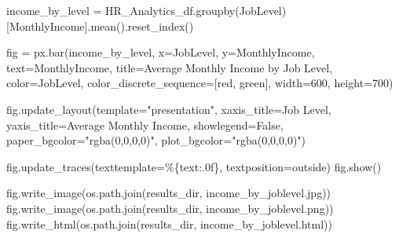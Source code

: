 \documentclass[
  letterpaper,
  DIV=11,
  numbers=noendperiod]{scrartcl}
\newenvironment{Shaded}{\begin{snugshade}}{\end{snugshade}}
\newcommand{\DecValTok}[1]{\textcolor[rgb]{0.68,0.00,0.00}{#1}}
\newcommand{\NormalTok}[1]{\textcolor[rgb]{0.00,0.23,0.31}{#1}}
\newcommand{\OperatorTok}[1]{\textcolor[rgb]{0.37,0.37,0.37}{#1}}
\newcommand{\SpecialCharTok}[1]{\textcolor[rgb]{0.37,0.37,0.37}{#1}}
\newcommand{\StringTok}[1]{\textcolor[rgb]{0.13,0.47,0.30}{#1}}
\newcommand{\VariableTok}[1]{\textcolor[rgb]{0.07,0.07,0.07}{#1}}
\begin{document}
\begin{Shaded}
\begin{Highlighting}[]
\NormalTok{income\_by\_level }\OperatorTok{=}\NormalTok{ HR\_Analytics\_df.groupby(}\StringTok{\textquotesingle{}JobLevel\textquotesingle{}}\NormalTok{)[}\StringTok{\textquotesingle{}MonthlyIncome\textquotesingle{}}\NormalTok{].mean().reset\_index()}

\NormalTok{fig }\OperatorTok{=}\NormalTok{ px.bar(income\_by\_level,}
\NormalTok{             x}\OperatorTok{=}\StringTok{\textquotesingle{}JobLevel\textquotesingle{}}\NormalTok{,}
\NormalTok{             y}\OperatorTok{=}\StringTok{\textquotesingle{}MonthlyIncome\textquotesingle{}}\NormalTok{,}
\NormalTok{             text}\OperatorTok{=}\StringTok{\textquotesingle{}MonthlyIncome\textquotesingle{}}\NormalTok{,}
\NormalTok{             title}\OperatorTok{=}\StringTok{\textquotesingle{}Average Monthly Income by Job Level\textquotesingle{}}\NormalTok{,}
\NormalTok{             color}\OperatorTok{=}\StringTok{\textquotesingle{}JobLevel\textquotesingle{}}\NormalTok{,}
\NormalTok{             color\_discrete\_sequence}\OperatorTok{=}\NormalTok{[}\StringTok{\textquotesingle{}red\textquotesingle{}}\NormalTok{, }\StringTok{\textquotesingle{}green\textquotesingle{}}\NormalTok{],}
\NormalTok{             width}\OperatorTok{=}\DecValTok{600}\NormalTok{,}
\NormalTok{             height}\OperatorTok{=}\DecValTok{700}\NormalTok{)}

\NormalTok{fig.update\_layout(template}\OperatorTok{=}\StringTok{"presentation"}\NormalTok{,}
\NormalTok{                  xaxis\_title}\OperatorTok{=}\StringTok{\textquotesingle{}Job Level\textquotesingle{}}\NormalTok{,}
\NormalTok{                  yaxis\_title}\OperatorTok{=}\StringTok{\textquotesingle{}Average Monthly Income\textquotesingle{}}\NormalTok{,}
\NormalTok{                  showlegend}\OperatorTok{=}\VariableTok{False}\NormalTok{,}
\NormalTok{                  paper\_bgcolor}\OperatorTok{=}\StringTok{"rgba(0,0,0,0)"}\NormalTok{,}
\NormalTok{                  plot\_bgcolor}\OperatorTok{=}\StringTok{"rgba(0,0,0,0)"}\NormalTok{)}

\NormalTok{fig.update\_traces(texttemplate}\OperatorTok{=}\StringTok{\textquotesingle{}\%}\SpecialCharTok{\{text:.0f\}}\StringTok{\textquotesingle{}}\NormalTok{, textposition}\OperatorTok{=}\StringTok{\textquotesingle{}outside\textquotesingle{}}\NormalTok{)}
\NormalTok{fig.show()}

\NormalTok{fig.write\_image(os.path.join(results\_dir, }\StringTok{\textquotesingle{}income\_by\_joblevel.jpg\textquotesingle{}}\NormalTok{))}
\NormalTok{fig.write\_image(os.path.join(results\_dir, }\StringTok{\textquotesingle{}income\_by\_joblevel.png\textquotesingle{}}\NormalTok{))}
\NormalTok{fig.write\_html(os.path.join(results\_dir, }\StringTok{\textquotesingle{}income\_by\_joblevel.html\textquotesingle{}}\NormalTok{))}
\end{Highlighting}
\end{Shaded}
\end{document}
